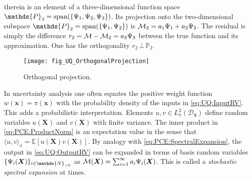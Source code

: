 therein is an element of a three-dimensional function space \(\mathds{P}_3 = \mathrm{span}(\{\basis_1,\basis_2,\basis_3\})\).
Its projection onto the two-dimensional subspace \(\mathds{P}_2 = \mathrm{span}(\{\basis_1,\basis_2\})\)
is \(\mathcal{M}_2 = a_1 \Psi_1 + a_2 \Psi_2\).
The residual is simply the difference \(r_2 = \mathcal{M} - \mathcal{M}_2 = a_3 \Psi_3\) between the true function and its approximation.
One has the orthogonality \(r_2 \, \bot \, \mathds{P}_2\).
\begin{figure}[htbp]
  \centering
  \texttt{[image: fig\_UQ\_OrthogonalProjection]}
  \caption[Orthogonal projection]{Orthogonal projection.}
  \label{fig:UQ:OrthogonalProjection}
\end{figure}
\par %
In uncertainty analysis one often equates the positive weight function \(w(\bm{x}) = \pi(\bm{x})\) with the probability density of the inputs in \cref{eq:UQ:InputRV}.
This adds a probabilistic interpretation.
Elements \(u,v \in L_{\pi}^2(\mathcal{D}_{\bm{x}})\) define random variables \(u(\bm{X})\) and \(v(\bm{X})\) with finite variance.
The inner product in \cref{eq:PCE:ProductNorm} is an expectation value in the sense that \(\langle u, v \rangle_\pi = \mathds{E}[u(\bm{X}) v(\bm{X})]\).
By analogy with \cref{eq:PCE:SpectralExpansion}, the output in \cref{eq:UQ:OutputRV} can be expanded in terms of basis random variables \(\{\basis_{i}(\bm{X})\}_{i \in \mathds{N}_{>0}}\)
as \(\mathcal{M}(\bm{X}) = \sum_{i=1}^\infty a_{i} \Psi_{i}(\bm{X})\).
This is called a \emph{stochastic spectral expansion} at times.

